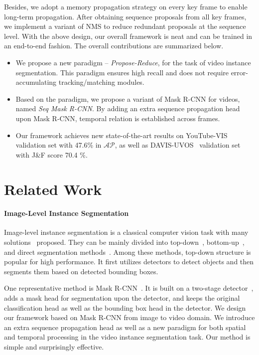 \documentclass[10pt,twocolumn,letterpaper]{article}
\begin{document}
	Besides, we adopt a memory propagation strategy on every key frame to enable long-term propagation.
	After obtaining sequence proposals from all key frames, we implement a variant of NMS to reduce redundant proposals at the sequence level.
	With the above design, our overall framework is neat and can be trained in an end-to-end fashion.
	The overall contributions are summarized below.
	\begin{itemize}
		\item We propose a new paradigm -- {\it Propose-Reduce}, for the task of video instance segmentation. This paradigm ensures high recall and does not require error-accumulating tracking/matching modules.
		\item Based on the paradigm, we propose a variant of Mask R-CNN for videos, named {\it Seq Mask R-CNN}. By adding an extra sequence propagation head upon Mask R-CNN, temporal relation is established across frames. 
		\item Our framework achieves new state-of-the-art results on YouTube-VIS~\cite{yang2019vis} validation set with 47.6\% in $\mathcal{AP}$, as well as DAVIS-UVOS~\cite{Caelles_arXiv_2019} validation set with {J\&F} score 70.4 \%.
		
	\end{itemize}
	
	\section{Related Work}
	\paragraph{Image-Level Instance Segmentation}
	Image-level instance segmentation is a classical computer vision task with many solutions~\cite{he2017mask,huang2019mask,liu2018path,wang2020solo,chen2019tensormask,xie2020polarmasK,bolya2019yolact,qi2020pointins} proposed. 
	They can be mainly divided into top-down~\cite{he2017mask,huang2019mask,liu2018path,bolya2019yolact,lee2020centermask}, bottom-up~\cite{liu2017sgn,newell2017associative}, and direct segmentation methods~\cite{wang2020solo,xie2020polarmasK}. 
	Among these methods, top-down structure is popular for high performance.
	It first utilizes detectors to detect objects and then segments them based on detected bounding boxes. 
	
	One representative method is Mask R-CNN~\cite{he2017mask}. It is built on a two-stage detector~\cite{ren2015faster}, adds a mask head for segmentation upon the detector, and keeps the original classification head as well as the bounding box head in the detector. 
	We design our framework based on Mask R-CNN from image to video domain. We introduce an extra sequence propagation head as well as a new paradigm for both spatial and temporal processing in the video instance segmentation task. Our method is simple and surprisingly effective.
	
\end{document}
